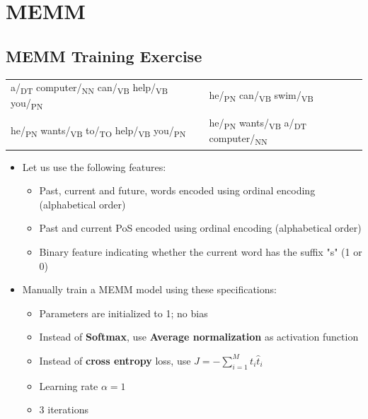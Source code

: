 \documentclass{../extra/aakpract/aakpract}
\begin{document}
	
	\section{MEMM}
	
	\subsection{MEMM Training Exercise}
	
	\begin{center}
		\begin{tabular}{|lll|}
			\hline
			a/\textsubscript{DT} computer/\textsubscript{NN} can/\textsubscript{VB} help/\textsubscript{VB} you/\textsubscript{PN} &&
			he/\textsubscript{PN} can/\textsubscript{VB} swim/\textsubscript{VB}\\
			he/\textsubscript{PN} wants/\textsubscript{VB} to/\textsubscript{TO} help/\textsubscript{VB} you/\textsubscript{PN} &&
			he/\textsubscript{PN} wants/\textsubscript{VB} a/\textsubscript{DT} computer/\textsubscript{NN} \\
			\hline
		\end{tabular}
	\end{center}
	
	\begin{itemize}
		\item Let us use the following features:
		\begin{itemize}
			\item Past, current and future, words encoded using ordinal encoding (alphabetical order)
			\item Past and current PoS encoded using ordinal encoding (alphabetical order)
			\item Binary feature indicating whether the current word has the suffix "s" (1 or 0)
		\end{itemize}
		\item Manually train a MEMM model using these specifications:
		\begin{itemize}
			\item Parameters are initialized to 1; no bias
			\item Instead of \textbf{Softmax}, use \textbf{Average normalization} as activation function
			\item Instead of \textbf{cross entropy} loss, use $J = -\sum_{i=1}^{M} t_i \hat{t}_i$
			\item Learning rate $\alpha=1$ 
			\item 3 iterations
		\end{itemize}
	\end{itemize}
	
\end{document}
